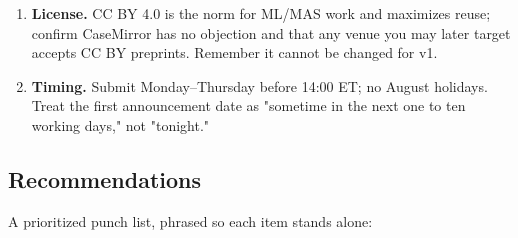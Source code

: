 \documentclass[twocolumn,10pt,letterpaper]{article}
\begin{document}
\begin{enumerate}
  \item \textbf{License.} CC BY 4.0 is the norm for ML/MAS work and maximizes reuse; confirm CaseMirror has no objection and that any venue you may later target accepts CC BY preprints. Remember it cannot be changed for v1.
  \item \textbf{Timing.} Submit Monday–Thursday before 14:00 ET; no August holidays. Treat the first announcement date as "sometime in the next one to ten working days," not "tonight."
\end{enumerate}

\subsection{Recommendations}

A prioritized punch list, phrased so each item stands alone:
\end{document}
